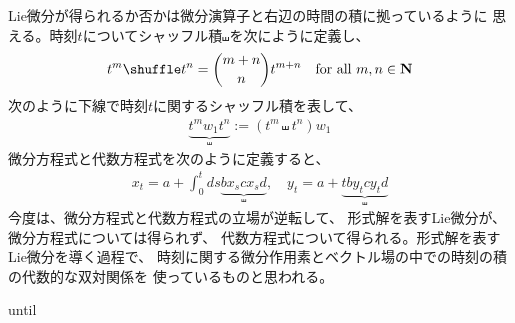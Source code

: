{\begin{note}[テイラー展開]
		Lie微分が得られるか否かは微分演算子と右辺の時間の積に拠っているように
		思える。時刻$t$についてシャッフル積$\shuffle$を次にように定義し、
		\begin{equation*}\begin{split}
			t^m\shuffle t^n = \binom{m+n}{n}t^{m+n}
			\quad\text{for all } m,n\in\sizen
		\end{split}\end{equation*}
		次のように下線で時刻$t$に関するシャッフル積を表して、
		\begin{equation*}\begin{split}
			\underbrace{t^mw_1t^n}_\shuffle := (t^m\shuffle t^n)w_1
		\end{split}\end{equation*}
		微分方程式と代数方程式を次のように定義すると、
		\begin{equation*}\begin{split}
			x_t = a + \int_0^tds \underbrace{bx_scx_sd}_\shuffle,\quad
			y_t = a + \underbrace{tby_tcy_td}_\shuffle
		\end{split}\end{equation*}
		今度は、微分方程式と代数方程式の立場が逆転して、
		形式解を表すLie微分が、微分方程式については得られず、
		代数方程式について得られる。形式解を表すLie微分を導く過程で、
		時刻に関する微分作用素とベクトル場の中での時刻の積の代数的な双対関係を
		使っているものと思われる。

		until


\end{note}}
